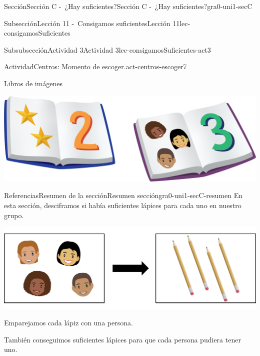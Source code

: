 \documentclass[twoside,10pt,]{article}
\begin{document}
\begin{sectionptx}{Sección}{Sección C -~¿Hay suficientes?}{}{Sección C -~¿Hay suficientes?}{}{}{gra0-uni1-secC}
\begin{subsectionptx}{Subsección}{Lección 11 -~Consigamos suficientes}{}{Lección 11}{}{}{lec-consigamosSuficientes}
\begin{subsubsectionptx}{Subsubsección}{Actividad 3}{}{Actividad 3}{}{}{lec-consigamosSuficientes-act3}
\begin{activity}{Actividad}{Centros: Momento de escoger.}{act-centros-escoger7}
\begin{sidebyside}{2}{0.025}{0.025}{0.05}
\begin{sbspanel}{0.45}
\end{sbspanel}%
\begin{sbspanel}{0.45}%
Libros de imágenes%
\par
\includegraphics[width=\linewidth]{external/png-source/K.1.D Beta Student Workbooks.Books.png}
\end{sbspanel}%
\end{sidebyside}%
\end{activity}%
\end{subsubsectionptx}
\end{subsectionptx}
%
%
\typeout{************************************************}
\typeout{************************************************}
%
\begin{references-subsection}{Referencias}{Resumen de la sección}{}{Resumen sección}{}{}{gra0-uni1-secC-resumen}
En esta sección, desciframos si había suficientes lápices para cada uno en nuestro grupo.%
\begin{image}{0}{1}{0}{}%
\includegraphics[width=\linewidth]{external/png-source/K.1.C Beta Student Workbook.4Kids4Pencils.png}
\end{image}%
Emparejamos cada lápiz con una persona.%
\par
También conseguimos suficientes lápices para que cada persona pudiera tener uno.%
\end{references-subsection}
\end{sectionptx}
%
%
\typeout{************************************************}
\typeout{************************************************}
%
\end{document}
